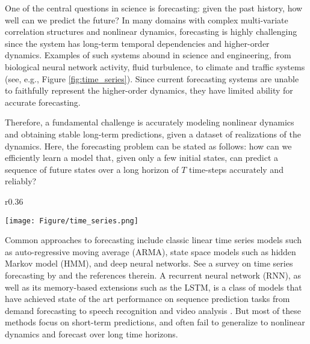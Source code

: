

One of the central questions in science is forecasting: given the past history, how well can we predict the future?
%
In many domains with complex multi-variate correlation structures and nonlinear dynamics, forecasting is highly challenging since the system has long-term temporal dependencies and higher-order dynamics. Examples of such systems abound in science and engineering, from biological neural network activity, fluid turbulence, to climate and traffic systems (see, e.g., Figure \ref{fig:time_series}).
%
Since current forecasting systems are unable to faithfully represent the higher-order dynamics, they have limited ability for accurate  forecasting.


%
Therefore, a fundamental challenge is accurately modeling nonlinear dynamics and obtaining stable long-term predictions, given a dataset of realizations of the dynamics.
%
Here, the forecasting problem can be stated as follows: how can we efficiently learn a model that, given only a few initial states, can  predict a sequence of future states over a long horizon of $T$ time-steps accurately and reliably?

\begin{wrapfigure}{r}{0.36\textwidth}
\vspace{-18pt}
\begin{center}
\texttt{[image: Figure/time\_series.png]}
\caption{Climate and traffic time series visualization. The time series can be viewed as a realization of highly nonlinear dynamics. 
}
\label{fig:time_series}
\vspace{-20pt}
\end{center}
\end{wrapfigure}

Common approaches to forecasting include classic linear time series models such as auto-regressive moving average (ARMA), state space models such as hidden Markov model (HMM), and deep neural networks. See a survey on time series forecasting by \citep{box2015time} and the references therein.
%
A recurrent neural network (RNN), as well as its memory-based extensions such as the LSTM, is a class of models that have achieved state of the art performance on sequence prediction tasks from demand forecasting \citep{ flunkert2017deepar} to speech recognition \citep{soltau2016neural} and video analysis \citep{lecun2015deep}.
%
But most of these methods focus on short-term predictions, and often fail to generalize to nonlinear dynamics and forecast over long time horizons. 



